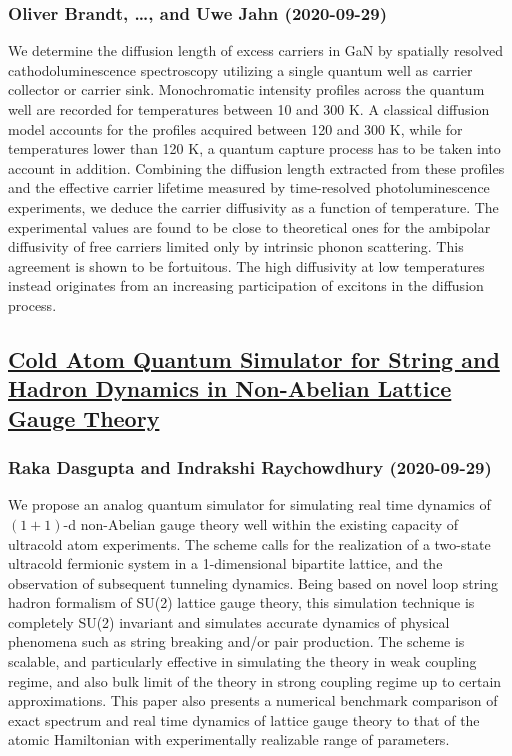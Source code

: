 \subsubsection*{Oliver Brandt, \dots, and Uwe Jahn (2020-09-29)}
We determine the diffusion length of excess carriers in GaN by spatially
resolved cathodoluminescence spectroscopy utilizing a single quantum well as
carrier collector or carrier sink. Monochromatic intensity profiles across the
quantum well are recorded for temperatures between 10 and 300 K. A classical
diffusion model accounts for the profiles acquired between 120 and 300 K, while
for temperatures lower than 120 K, a quantum capture process has to be taken
into account in addition. Combining the diffusion length extracted from these
profiles and the effective carrier lifetime measured by time-resolved
photoluminescence experiments, we deduce the carrier diffusivity as a function
of temperature. The experimental values are found to be close to theoretical
ones for the ambipolar diffusivity of free carriers limited only by intrinsic
phonon scattering. This agreement is shown to be fortuitous. The high
diffusivity at low temperatures instead originates from an increasing
participation of excitons in the diffusion process.

\subsection*{\href{http://arxiv.org/abs/2009.13969v1}{Cold Atom Quantum Simulator for String and Hadron Dynamics in  Non-Abelian Lattice Gauge Theory}}
\subsubsection*{Raka Dasgupta and Indrakshi Raychowdhury (2020-09-29)}
We propose an analog quantum simulator for simulating real time dynamics of
$(1+1)$-d non-Abelian gauge theory well within the existing capacity of
ultracold atom experiments. The scheme calls for the realization of a two-state
ultracold fermionic system in a 1-dimensional bipartite lattice, and the
observation of subsequent tunneling dynamics. Being based on novel loop string
hadron formalism of SU(2) lattice gauge theory, this simulation technique is
completely SU(2) invariant and simulates accurate dynamics of physical
phenomena such as string breaking and/or pair production. The scheme is
scalable, and particularly effective in simulating the theory in weak coupling
regime, and also bulk limit of the theory in strong coupling regime up to
certain approximations. This paper also presents a numerical benchmark
comparison of exact spectrum and real time dynamics of lattice gauge theory to
that of the atomic Hamiltonian with experimentally realizable range of
parameters.

